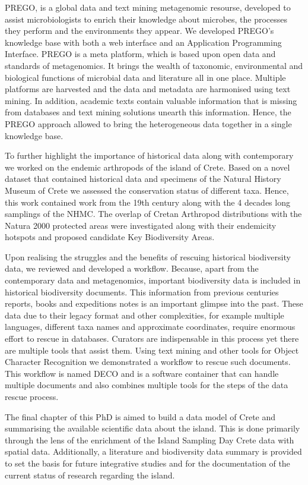 \documentclass[
11pt, %
english, %
singlespacing, %
liststotoc, %
toctotoc, %
headsepline, %
]{MastersDoctoralThesis} %
\begin{document}
PREGO, is a global data and text mining metagenomic resourse, developed to assist microbiologists
to enrich their knowledge about microbes, the processes they perform and the environments 
they appear. We developed PREGO's knowledge base with both a web interface and an Application Programming Interface.
PREGO is a meta platform, which is based upon open data and standards of metagenomics. 
It brings the wealth of taxonomic, environmental and biological functions of 
microbial data and literature all in one place. Multiple platforms are harvested and the data 
and metadata are harmonised using text mining. In addition, academic texts contain 
valuable information that is missing from databases and text mining solutions unearth 
this information. Hence, the PREGO approach allowed to bring the heterogeneous
data together in a single knowledge base. 

To further highlight the importance of historical data along with contemporary we 
worked on the endemic arthropods of the island of Crete. Based on a novel dataset
that contained historical data and specimens of the Natural History Museum of Crete
we assessed the conservation status of different taxa. Hence, this work contained 
work from the 19th century along with the 4 decades long samplings of the NHMC. 
The overlap of Cretan Arthropod distributions with the Natura 2000 protected areas
were investigated along with their endemicity hotspots and proposed candidate Key Biodiversity Areas.

Upon realising the struggles and the benefits of rescuing historical biodiversity data, we 
reviewed and developed a workflow. Because, apart from the contemporary data and metagenomics, important biodiversity data is 
included in historical biodiversity documents. This information from 
previous centuries reports, books and expeditions notes is an important glimpse into
the past. These data due to their legacy format and other complexities, for example 
multiple languages, different taxa names and approximate coordinates, require 
enormous effort to rescue in databases. Curators are indispensable in this process 
yet there are multiple tools that assist them. Using text mining and other tools 
for Object Character Recognition we demonstrated a workflow to rescue such documents.
This workflow is named DECO and is a software container that can handle multiple 
documents and also combines multiple tools for the steps of the data rescue process.

The final chapter of this PhD is aimed to build a data model of Crete and summarising the 
available scientific data about the island. This is done primarily through the lens of the enrichment of
the Island Sampling Day Crete data with spatial data. Additionally, a literature and biodiversity data summary is 
provided to set the basis for future integrative studies and for the documentation of the current status of 
research regarding the island.
\end{document}
